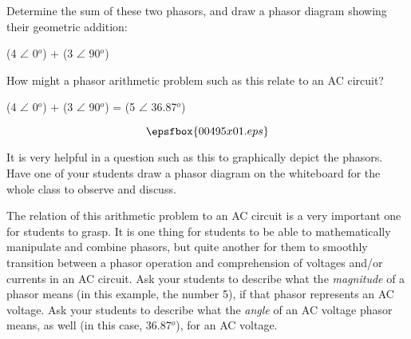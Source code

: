 

Determine the sum of these two phasors, and draw a phasor diagram showing their geometric addition:

\vskip 10pt

(4 $\angle$ 0$^o$) + (3 $\angle$ 90$^o$)

\vskip 10pt

How might a phasor arithmetic problem such as this relate to an AC circuit?







(4 $\angle$ 0$^o$) + (3 $\angle$ 90$^o$) = (5 $\angle$ 36.87$^o$)

$$\epsfbox{00495x01.eps}$$







It is very helpful in a question such as this to graphically depict the phasors.  Have one of your students draw a phasor diagram on the whiteboard for the whole class to observe and discuss.

The relation of this arithmetic problem to an AC circuit is a very important one for students to grasp.  It is one thing for students to be able to mathematically manipulate and combine phasors, but quite another for them to smoothly transition between a phasor operation and comprehension of voltages and/or currents in an AC circuit.  Ask your students to describe what the {\it magnitude} of a phasor means (in this example, the number 5), if that phasor represents an AC voltage.  Ask your students to describe what the {\it angle} of an AC voltage phasor means, as well (in this case, 36.87$^{o}$), for an AC voltage.




